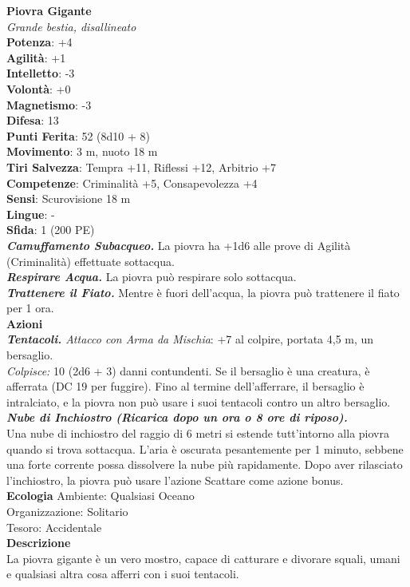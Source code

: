 \begin{multicols}{2}
\medskip\textbf{Piovra Gigante}\\
\emph{Grande bestia, disallineato}\\
\textbf{Potenza}: +4\\
\textbf{Agilità}: +1\\
\textbf{Intelletto}: -3\\
\textbf{Volontà}: +0\\
\textbf{Magnetismo}: -3\\
\textbf{Difesa}: 13\\
\textbf{Punti Ferita}: 52 (8d10 + 8)\\
\textbf{Movimento}: 3 m, nuoto 18 m\\
\textbf{Tiri Salvezza}: Tempra +11, Riflessi +12, Arbitrio +7 \\
\textbf{Competenze}: Criminalità +5, Consapevolezza +4\\
\textbf{Sensi}: Scurovisione 18 m\\
\textbf{Lingue}: -\\
\textbf{Sfida}: 1 (200 PE)\smallskip\\
\emph{\textbf{Camuffamento Subacqueo.}} La piovra ha +1d6 alle prove di Agilità (Criminalità) effettuate sottacqua.\\
\emph{\textbf{Respirare Acqua.}} La piovra può respirare solo sottacqua.\\
\emph{\textbf{Trattenere il Fiato.}} Mentre è fuori dell'acqua, la piovra può trattenere il fiato per 1 ora.\\
\smallskip\textbf{Azioni}\\
\emph{\textbf{Tentacoli.} Attacco con Arma da Mischia}: +7 al colpire, portata 4,5 m, un bersaglio.\\
\emph{Colpisce:} 10 (2d6 + 3) danni contundenti. Se il bersaglio è una creatura, è afferrata (DC  19 per fuggire). Fino al termine dell'afferrare, il bersaglio è intralciato, e la piovra non può usare i suoi tentacoli contro un altro bersaglio.\\
\emph{\textbf{Nube di Inchiostro (Ricarica dopo un ora o 8 ore di riposo).}}\\
Una nube di inchiostro del raggio di 6 metri si estende tutt'intorno alla piovra quando si trova sottacqua. L'aria è oscurata pesantemente per 1 minuto, sebbene una forte corrente  possa dissolvere la nube più rapidamente. Dopo aver rilasciato  l'inchiostro, la piovra può usare l'azione Scattare come azione bonus. \\
\textbf{Ecologia}
Ambiente: Qualsiasi Oceano\\
Organizzazione: Solitario\\
Tesoro: Accidentale\\
\textbf{Descrizione}\\
La piovra gigante è un vero mostro, capace di catturare e divorare squali, umani e qualsiasi altra cosa afferri con i suoi tentacoli. \\


\end{multicols}
